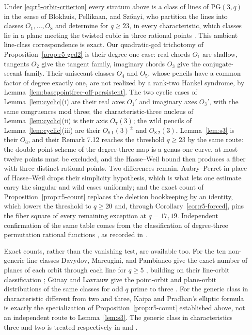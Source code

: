 \begin{remark}
Under \eqref{eq:r5-orbit-criterion} every stratum above is a class of
lines of $\mathrm{PG}(3,q)$ in the sense of Blokhuis, Pellikaan, and
Sz\H onyi, who partition the lines into classes $O_1,\ldots,O_8$ and
determine for $q\geq23$, in every characteristic, which classes lie in
a plane meeting the twisted cubic in three rational points
\cite[Thm.~8.1 and Prop.~8.4]{BPS2022}.  This ambient line-class
correspondence is exact.
Our quadratic-gcd trichotomy of Proposition~\ref{prop:r5-gcd2} is their
degree-one case: real chords $O_1$ are shallow, tangents $O_2$ give the
tangent family, imaginary chords $O_3$ give the conjugate-secant
family.  Their unisecant classes \(O_4\) and \(O_5\), whose pencils have a
common factor of degree exactly one, are not realized by a rank-two Hankel
syndrome, by Lemma~\ref{lem:basepointfree-off-persistent}.  The two
cyclic cases of Lemma~\ref{lem:cyclic}(i) are their real axes $O_1'$
and imaginary axes $O_3'$, with the same congruences mod three; the
characteristic-three nucleus of Lemma~\ref{lem:cyclic}(ii) is their
axis $O_7(3)$; the wild pencils of Lemma~\ref{lem:cyclic}(iii) are
their $O_{8.1}(3)^{\pm}$ and $O_{8.2}(3)$.  Lemma~\ref{lem:s3} is their
$O_6$, and their Remark 7.12 reaches the threshold $q\geq23$ by the
same route: the double point scheme of the degree-three map is a
genus-one curve, at most twelve points must be excluded, and the
Hasse--Weil bound then produces a fiber with three distinct rational
points.  Two differences remain.  Aubry--Perret in place of
Hasse--Weil drops their simplicity hypothesis, which is what lets one
estimate carry the singular and wild cases uniformly; and the exact
count of Proposition~\ref{prop:r5-count} replaces the deletion
bookkeeping by an identity, which lowers the threshold to $q\geq20$
and, through Corollary~\ref{cor:r5-forced}, pins the fiber square of
every remaining exception at $q=17,19$.  Independent confirmation of the same table comes from the
classification of degree-three permutation rational functions
\cite{FerragutiMicheli2020}, as recorded in \cite[Rem.~8.6]{BPS2022}.

Exact counts, rather than the vanishing test, are available too.  For
the ten non-generic line classes Davydov, Marcugini, and Pambianco give
the exact number of planes of each orbit through each line for
$q\geq5$ \cite[Thm.~3.3]{DMP2022}, building on their line-orbit
classification \cite{DMP2023,DMP2021}; G\"unay and Lavrauw give the
point-orbit and plane-orbit distributions of the same classes for odd
$q$ prime to three \cite{GunayLavrauw2022}.  For the generic class in
characteristic different from two and three, Kaipa and Pradhan's elliptic
formula is exactly the specialization of Proposition~\ref{prop:r5-count}
established above, not an independent route to Lemma~\ref{lem:s3}.  The
generic class in characteristics three and two is treated respectively in
\cite{KaipaPradhan2025char3} and \cite{CeriaPavese2023}.


\end{remark}
